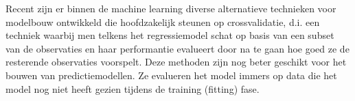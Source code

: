 \documentclass[12pt,dutch,coursenotes]{book}
\theoremstyle{definition}
\theoremstyle{definition}
\theoremstyle{definition}
\theoremstyle{remark}
\begin{document}
Recent zijn er binnen de machine learning diverse alternatieve
technieken voor modelbouw ontwikkeld die hoofdzakelijk steunen op
crossvalidatie, d.i. een techniek waarbij men telkens het regressiemodel
schat op basis van een subset van de observaties en haar performantie
evalueert door na te gaan hoe goed ze de resterende observaties
voorspelt. Deze methoden zijn nog beter geschikt voor het bouwen van
predictiemodellen. Ze evalueren het model immers op data die het model
nog niet heeft gezien tijdens de training (fitting) fase.


\end{document}
